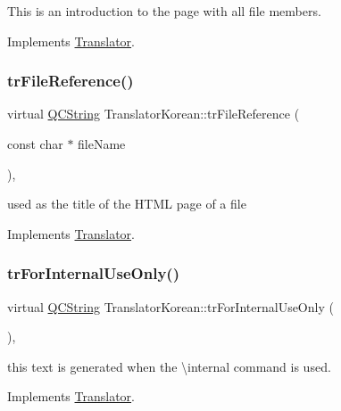 This is an introduction to the page with all file members. 

Implements \mbox{\hyperlink{class_translator}{Translator}}.

\mbox{\label{class_translator_korean_abc3deb420944ab72e5187774e01c0b1c}} 
\subsubsection{\texorpdfstring{trFileReference()}{trFileReference()}}
{\footnotesize\ttfamily virtual \mbox{\hyperlink{class_q_c_string}{Q\+C\+String}} Translator\+Korean\+::tr\+File\+Reference (\begin{DoxyParamCaption}\item[{const char $\ast$}]{file\+Name }\end{DoxyParamCaption})\hspace{0.3cm}{\ttfamily [inline]}, {\ttfamily [virtual]}}

used as the title of the H\+T\+ML page of a file 

Implements \mbox{\hyperlink{class_translator}{Translator}}.

\mbox{\label{class_translator_korean_a774b40a6a94713fc8dd143a25d4c0b8c}} 
\subsubsection{\texorpdfstring{trForInternalUseOnly()}{trForInternalUseOnly()}}
{\footnotesize\ttfamily virtual \mbox{\hyperlink{class_q_c_string}{Q\+C\+String}} Translator\+Korean\+::tr\+For\+Internal\+Use\+Only (\begin{DoxyParamCaption}{ }\end{DoxyParamCaption})\hspace{0.3cm}{\ttfamily [inline]}, {\ttfamily [virtual]}}

this text is generated when the \textbackslash{}internal command is used. 

Implements \mbox{\hyperlink{class_translator}{Translator}}.

\mbox{\label{class_translator_korean_a9ca507e1f57306b0b59a0649575d4974}} 
